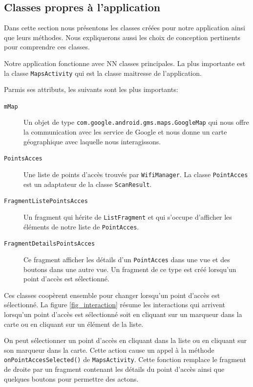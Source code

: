 \documentclass[12pt]{article}
\newcommand\code[1]{\texttt{#1}}
\begin{document}
\subsection{Classes propres à l'application}

	Dans cette section nous présentons les classes créées pour notre application
	ainsi que leurs méthodes.  Nous expliquerons aussi les choix de conception
	pertinents pour comprendre ces classes.

	Notre application fonctionne avec NN classes principales.  La plus
	importante est la classe \code{MapsActivity} qui est la classe maitresse de
	l'application.

	Parmis ses attributs, les suivants sont les plus importants:
	\begin{description}
		\item[\code{mMap}]

			Un objet de type \code{com.google.android.gms.maps.GoogleMap} qui
			nous offre la communication avec les service de Google et nous donne
			un carte géographique avec laquelle nous interagissons.

		\item[\code{PointsAcces}]

			Une liste de points d'accès trouvés par \code{WifiManager}.  La
			classe \code{PointAcces} est un adaptateur de la classe
			\code{ScanResult}.

		\item[\code{FragmentListePointsAcces}]

			Un fragment qui hérite de \code{ListFragment} et qui s'occupe
			d'afficher les éléments de notre liste de \code{PointAcces}.

		\item[\code{FragmentDetailsPointsAcces}]

			Ce fragment afficher les détails d'un \code{PointAcces} dans une
			vue et des boutons dans une autre vue.  Un fragment de ce type est
			créé lorsqu'un point d'accès est sélectionné.
	\end{description}

	Ces classes coopèrent ensemble pour changer lorsqu'un point d'accès est
	sélectionné.  La figure \ref{fig_interaction} résume les interactions qui
	arrivent lorsqu'un point d'accès est sélectionné soit en cliquant sur un
	marqueur dans la carte ou en cliquant sur un élément de la liste.

	On peut sélectionner un point d'accès en cliquant dans la liste ou en
	cliquant sur son marqueur dans la carte.  Cette action cause un appel à la
	méthode \code{onPointAccesSelected()} de \code{MapsActivity}.  Cette
	fonction remplace le fragment de droite par un fragment contenant les
	détails du point d'accès ainsi que quelques boutons pour permettre des
	actons.
\end{document}
